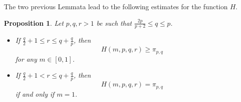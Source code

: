 \documentclass{amsart}
\newtheorem{prop}[thm]{Proposition}
\theoremstyle{definition}
\theoremstyle{remark}
\begin{document}

The two previous Lemmata lead to the following estimates for the function $H$. 
\begin{prop}
\label{prop_stime_H}
 Let $p,q,r>1$ be such that $\frac{2p}{p+2}\le q\leq p$.
 \begin{itemize}
 \item[(i)] If $\frac q2+1\le r\le q+\frac q p$,  then  
\[
H\left(m,p,q,r \right)\ge\pi_{p,q}
\]
for any $m\in[0,1]$.
 \item[(ii)] If $\frac q2+1 < r\le q+\frac q p$,  then  
\[
H\left(m,p,q,r \right)=\pi_{p,q}
\]
if and only if $m=1$.
 \end{itemize}
  \end{prop}
  
\end{document}
